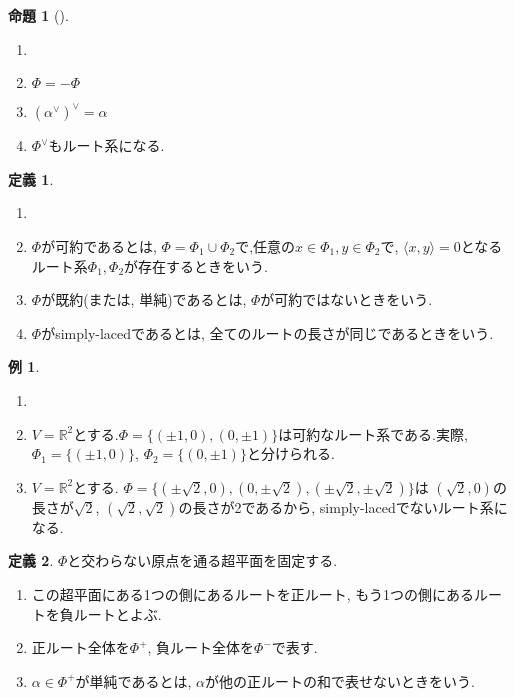 \documentclass[
  a4paper, 
  12pt,
  ja=standard,
  xelatex,
  left=30truemm,
  right=30truemm,
  titlepage 
]{bxjsarticle}
\theoremstyle{definition}
\newtheorem{df}{定義}
\newtheorem{prop}[thm]{命題}
\newtheorem*{ex}{例}
\begin{document}
\begin{prop} [{\cite[6章1節命題2]{b3}}] 
  \begin{enumerate}
    \item[]
    \item $\Phi = - \Phi$
    \item $(\alpha^{\vee})^{ \vee} = \alpha$
    \item $\Phi^{\vee}$もルート系になる.
  \end{enumerate}
\end{prop}

\begin{df}  
  \begin{enumerate} 
    \item[]
    \item $ \Phi $が可約であるとは, $ \Phi = \Phi_1 \cup \Phi_2 $で,任意の$ x \in \Phi_1, y \in \Phi_2 $で,
    $ \langle x, y \rangle = 0 $となるルート系$ \Phi_1, \Phi_2  $が存在するときをいう.
    \item $ \Phi $が既約(または, 単純)であるとは, $ \Phi $が可約ではないときをいう.
    \item $ \Phi $がsimply-lacedであるとは, 全てのルートの長さが同じであるときをいう.
  \end{enumerate} 
\end{df}

\begin{ex}
  \begin{enumerate}
    \item[]
    \item $ V = \mathbb{R}^2$とする.$ \Phi = \{ (\pm 1, 0), (0, \pm1) \}$は可約なルート系である.実際,
    $ \Phi_1 = \{ (\pm 1, 0)\}$, $ \Phi_2 = \{ (0, \pm 1)\}$と分けられる.
    \item $ V = \mathbb{R}^2$とする. $ \Phi = \{ (\pm \sqrt{2}, 0), (0, \pm\sqrt{2}), (\pm\sqrt{2}, \pm \sqrt{2}) \}$は
    $(\sqrt{2}, 0)$の長さが$\sqrt{2}$, $(\sqrt{2}, \sqrt{2})$の長さが2であるから, simply-lacedでないルート系になる.
  \end{enumerate}
\end{ex}

\begin{df}
  $\Phi$と交わらない原点を通る超平面を固定する. 
  \begin{enumerate}
    \item この超平面にある1つの側にあるルートを正ルート, もう1つの側にあるルートを負ルートとよぶ.
    \item 正ルート全体を$ \Phi^{+} $, 負ルート全体を$ \Phi^{-} $で表す. 
    \item $\alpha \in \Phi^{+} $が単純であるとは, $\alpha$が他の正ルートの和で表せないときをいう.
  \end{enumerate}
\end{df}
\end{document}
